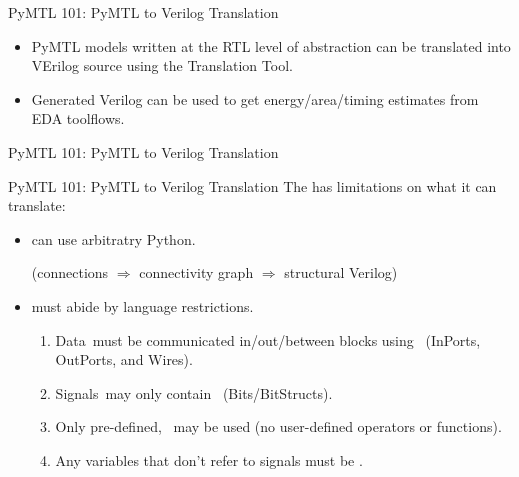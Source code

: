 \begin{frame}{PyMTL 101: PyMTL to Verilog Translation}

\begin{itemize}
  \item PyMTL models written at the RTL level of abstraction can be
        translated into VErilog source using the Translation Tool.
  \smallskip
  \item Generated Verilog can be used to get energy/area/timing estimates
        from EDA toolflows.
\end{itemize}

\vspace{0.3in}


\end{frame}

\begin{frame}{PyMTL 101: PyMTL to Verilog Translation}
\vspace{0.3in}
\end{frame}

\begin{frame}{PyMTL 101: PyMTL to Verilog Translation}
The  has limitations on what it can translate:

\smallskip
\begin{itemize}
  \item {} can use arbitratry Python.

        (connections $\Rightarrow$ connectivity graph $\Rightarrow$
         structural Verilog)

  \smallskip
  \item {} must abide by language restrictions.

  \pause
  \smallskip
  \begin{enumerate}
    \item Data must be communicated in/out/between blocks
          using  (InPorts, OutPorts, and Wires).
    \smallskip
    \item Signals may only contain 
          (Bits/BitStructs).
    \smallskip
    \item Only pre-defined,  may be
          used (no user-defined operators or functions).
    \smallskip
    \item Any variables that don't refer to signals must be .
  \end{enumerate}
\end{itemize}
\end{frame}

